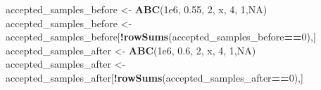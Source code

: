 \documentclass[
]{article}
\newenvironment{Shaded}{\begin{snugshade}}{\end{snugshade}}
\newcommand{\ConstantTok}[1]{\textcolor[rgb]{0.56,0.35,0.01}{#1}}
\newcommand{\DecValTok}[1]{\textcolor[rgb]{0.00,0.00,0.81}{#1}}
\newcommand{\FloatTok}[1]{\textcolor[rgb]{0.00,0.00,0.81}{#1}}
\newcommand{\FunctionTok}[1]{\textcolor[rgb]{0.13,0.29,0.53}{\textbf{#1}}}
\newcommand{\NormalTok}[1]{#1}
\newcommand{\OtherTok}[1]{\textcolor[rgb]{0.56,0.35,0.01}{#1}}
\newcommand{\SpecialCharTok}[1]{\textcolor[rgb]{0.81,0.36,0.00}{\textbf{#1}}}
\begin{document}
\begin{Shaded}
\begin{Highlighting}[]
\NormalTok{accepted\_samples\_before }\OtherTok{\textless{}{-}} \FunctionTok{ABC}\NormalTok{(}\FloatTok{1e6}\NormalTok{, }\FloatTok{0.55}\NormalTok{, }\DecValTok{2}\NormalTok{, x, }\DecValTok{4}\NormalTok{, }\DecValTok{1}\NormalTok{,}\ConstantTok{NA}\NormalTok{)}
\NormalTok{accepted\_samples\_before }\OtherTok{\textless{}{-}}\NormalTok{ accepted\_samples\_before[}\SpecialCharTok{!}\FunctionTok{rowSums}\NormalTok{(accepted\_samples\_before}\SpecialCharTok{==}\DecValTok{0}\NormalTok{),]}
\NormalTok{accepted\_samples\_after }\OtherTok{\textless{}{-}} \FunctionTok{ABC}\NormalTok{(}\FloatTok{1e6}\NormalTok{, }\FloatTok{0.6}\NormalTok{, }\DecValTok{2}\NormalTok{, x, }\DecValTok{4}\NormalTok{, }\DecValTok{1}\NormalTok{,}\ConstantTok{NA}\NormalTok{)}
\NormalTok{accepted\_samples\_after }\OtherTok{\textless{}{-}}\NormalTok{ accepted\_samples\_after[}\SpecialCharTok{!}\FunctionTok{rowSums}\NormalTok{(accepted\_samples\_after}\SpecialCharTok{==}\DecValTok{0}\NormalTok{),]}
\end{Highlighting}
\end{Shaded}
\end{document}
